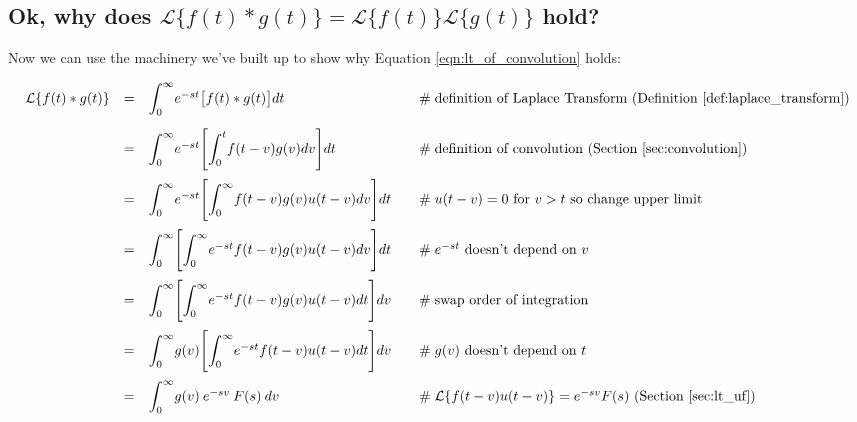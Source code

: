 \documentclass{article}
\theoremstyle{definition}
\begin{document}
\newpage
\subsection{Ok, why does $\mathcal{L}\{f(t) \ast g(t)\} =  \mathcal{L}\{f(t)\}\mathcal{L}\{g(t)\}$ hold?}

\bigskip
\noindent
Now we can use the machinery we've built up to show why Equation
\ref{eqn:lt_of_convolution} holds:

\begin{equation*}
\begin{array}{lllll}
\mathcal{L}\{f(t) \ast g(t)\} 
&=& \mathlarger{\int}^\infty_0 e^{-st} \big [ f(t) \ast g(t) \big ] dt                                                                 &\quad \mathrel{\#} \text{definition of Laplace Transform (Definition \ref{def:laplace_transform})}            \\
[15pt]                 
&=& \mathlarger{\int}^\infty_0 e^{-st} \Bigg [ \mathlarger{\int}^t_0 f(t-v) g(v) dv \Bigg ] dt                         &\quad \mathrel{\#} \text{definition of convolution (Section \ref{sec:convolution})}                                     \\
[15pt]
&=& \mathlarger{\int}^\infty_0 e^{-st} \Bigg [ \mathlarger{\int}^\infty_0 f(t-v) g(v ) u(t-v) dv \Bigg ] dt        &\quad \mathrel{\#} \text{$u(t-v) = 0$ for $v > t$ so change upper limit}                                                    \\
[15pt]
&=& \mathlarger{\int}^\infty_0 \Bigg [ \mathlarger{\int}^\infty_0  e^{-st} f(t-v) g(v ) u(t-v) dv \Bigg ] dt       &\quad \mathrel{\#} \text{$e^{-st}$ doesn't depend on $v$}                                                                        \\    
[15pt]
&=& \mathlarger{\int}^\infty_0 \Bigg [ \mathlarger{\int}^\infty_0  e^{-st} f(t-v) g(v ) u(t-v) dt \Bigg ] dv       &\quad \mathrel{\#} \text{swap order of integration}                                                                                   \\    
[15pt]
&=& \mathlarger{\int}^\infty_0 g(v) \Bigg [ \mathlarger{\int}^\infty_0  e^{-st} f(t-v) u(t-v) dt \Bigg ] dv        &\quad \mathrel{\#} \text{$g(v)$ doesn't depend on $t$}                                                                             \\     
[15pt]
&=& \mathlarger{\int}^\infty_0 g(v) \: e^{-sv} \: F(s) \: dv                                                                            &\quad \mathrel{\#} \mathcal{L}\{ f(t-v) u(t-v)\} = e^{-sv} F(s) \text{ (Section \ref{sec:lt_uf})}                      \\

\end{array}
\end{equation*}
\end{document}
